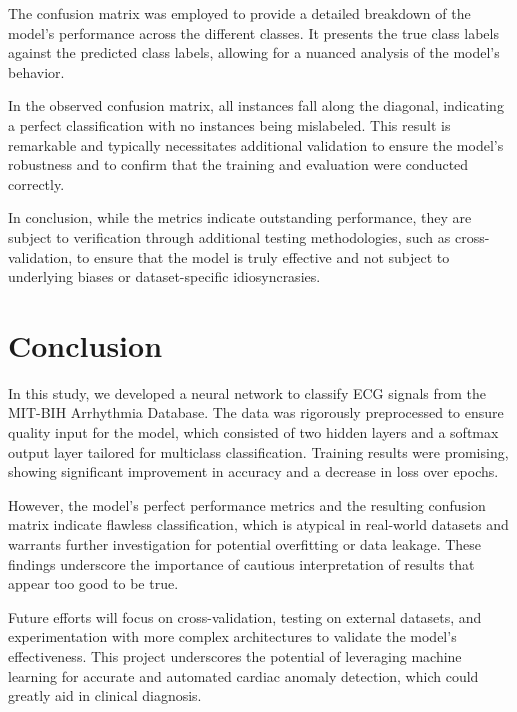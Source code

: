 \documentclass{report}
\begin{document}
The confusion matrix was employed to provide a detailed breakdown of the model's performance across the different classes. It presents the true class labels against the predicted class labels, allowing for a nuanced analysis of the model's behavior.

In the observed confusion matrix, all instances fall along the diagonal, indicating a perfect classification with no instances being mislabeled. This result is remarkable and typically necessitates additional validation to ensure the model's robustness and to confirm that the training and evaluation were conducted correctly.

In conclusion, while the metrics indicate outstanding performance, they are subject to verification through additional testing methodologies, such as cross-validation, to ensure that the model is truly effective and not subject to underlying biases or dataset-specific idiosyncrasies.


\section{Conclusion}

In this study, we developed a neural network to classify ECG signals from the MIT-BIH Arrhythmia Database. The data was rigorously preprocessed to ensure quality input for the model, which consisted of two hidden layers and a softmax output layer tailored for multiclass classification. Training results were promising, showing significant improvement in accuracy and a decrease in loss over epochs.

However, the model's perfect performance metrics and the resulting confusion matrix indicate flawless classification, which is atypical in real-world datasets and warrants further investigation for potential overfitting or data leakage. These findings underscore the importance of cautious interpretation of results that appear too good to be true.

Future efforts will focus on cross-validation, testing on external datasets, and experimentation with more complex architectures to validate the model's effectiveness. This project underscores the potential of leveraging machine learning for accurate and automated cardiac anomaly detection, which could greatly aid in clinical diagnosis.
\end{document}
